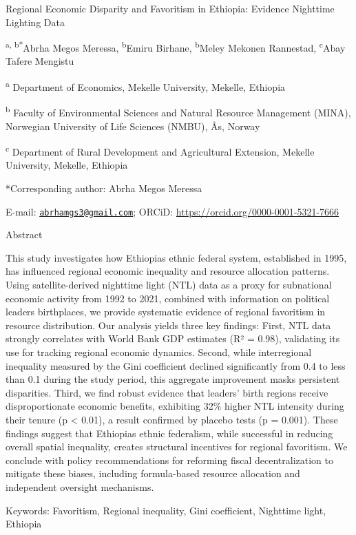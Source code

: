 Regional Economic Disparity and Favoritism in Ethiopia: Evidence
Nighttime Lighting Data

\textsuperscript{a, b*}Abrha Megos Meressa, \textsuperscript{b}Emiru
Birhane, \textsuperscript{b}Meley Mekonen Rannestad,
\textsuperscript{c}Abay Tafere Mengistu

\textsuperscript{a} Department of Economics, Mekelle University,
Mekelle, Ethiopia

\textsuperscript{b} Faculty of Environmental Sciences and Natural
Resource Management (MINA), Norwegian University of Life Sciences
(NMBU), Ås, Norway

\textsuperscript{c} Department of Rural Development and Agricultural
Extension, Mekelle University, Mekelle, Ethiopia

*Corresponding author: Abrha Megos Meressa

E-mail:
\href{mailto:abrhamgs3@gmail.com}{\nolinkurl{abrhamgs3@gmail.com}};
ORCiD: \url{https://orcid.org/0000-0001-5321-7666}

Abstract

This study investigates how Ethiopia\textquotesingle s ethnic federal
system, established in 1995, has influenced regional economic inequality
and resource allocation patterns. Using satellite-derived nighttime
light (NTL) data as a proxy for subnational economic activity from 1992
to 2021, combined with information on political
leaders\textquotesingle{} birthplaces, we provide systematic evidence of
regional favoritism in resource distribution. Our analysis yields three
key findings: First, NTL data strongly correlates with World Bank GDP
estimates (R² = 0.98), validating its use for tracking regional economic
dynamics. Second, while interregional inequality measured by the Gini
coefficient declined significantly from 0.4 to less than 0.1 during the
study period, this aggregate improvement masks persistent disparities.
Third, we find robust evidence that leaders' birth regions receive
disproportionate economic benefits, exhibiting 32\% higher NTL intensity
during their tenure (p \textless{} 0.01), a result confirmed by placebo
tests (p = 0.001). These findings suggest that
Ethiopia\textquotesingle s ethnic federalism, while successful in
reducing overall spatial inequality, creates structural incentives for
regional favoritism. We conclude with policy recommendations for
reforming fiscal decentralization to mitigate these biases, including
formula-based resource allocation and independent oversight mechanisms.

Keywords: Favoritism, Regional inequality, Gini coefficient, Nighttime
light, Ethiopia

